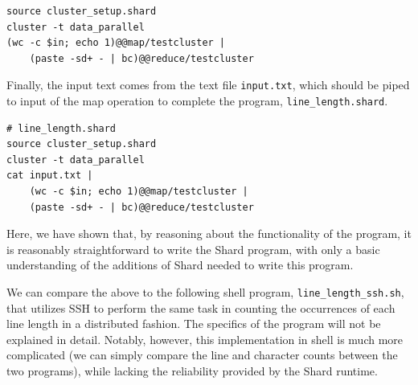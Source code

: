 \documentclass[twoside]{report}
\begin{document}
\begin{minipage}[c]{\textwidth-15pt}
  \begin{lstlisting}[language=Shard]
source cluster_setup.shard
cluster -t data_parallel
(wc -c $in; echo 1)@@map/testcluster |
    (paste -sd+ - | bc)@@reduce/testcluster
\end{lstlisting}
  \smallskip
\end{minipage}

Finally, the input text comes from the text file \texttt{input.txt}, which should be piped to input of the map operation to complete the program, \texttt{line\_length.shard}.

\begin{minipage}[c]{\textwidth-15pt}
  \begin{lstlisting}[language=Shard]
# line_length.shard
source cluster_setup.shard
cluster -t data_parallel
cat input.txt |
    (wc -c $in; echo 1)@@map/testcluster |
    (paste -sd+ - | bc)@@reduce/testcluster
\end{lstlisting}
  \smallskip
\end{minipage}

Here, we have shown that, by reasoning about the functionality of the program, it is reasonably straightforward to write the Shard program, with only a basic understanding of the additions of Shard needed to write this program.

We can compare the above to the following shell program, \texttt{line\_length\_ssh.sh}, that utilizes SSH to perform the same task in counting the occurrences of each line length in a distributed fashion.
The specifics of the program will not be explained in detail.
Notably, however, this implementation in shell is much more complicated (we can simply compare the line and character counts between the two programs), while lacking the reliability provided by the Shard runtime.
\end{document}
